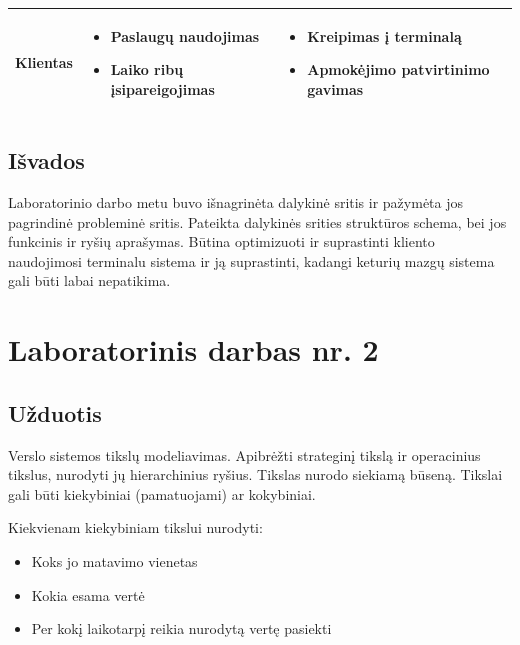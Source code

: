 \documentclass[10pt]{IEEEtran}
\begin{document}
\begin{table}[t]
\begin{tabular}{|c|p{5cm}|p{5cm}|}
                    Klientas &
                    \begin{itemize} 
                    \item Paslaugų naudojimas
                    \item Laiko ribų įsipareigojimas
                    \end{itemize}& 
                    \begin{itemize}
                    \item Kreipimas į terminalą
                    \item Apmokėjimo patvirtinimo gavimas
                    \end{itemize}\\ \hline
                \end{tabular}
            \end{table}

        \subsection{Išvados}

            Laboratorinio darbo metu buvo išnagrinėta dalykinė sritis ir pažymėta jos pagrindinė probleminė sritis. Pateikta dalykinės srities struktūros schema, bei jos funkcinis ir ryšių aprašymas. Būtina optimizuoti ir suprastinti kliento naudojimosi terminalu sistema ir ją suprastinti, kadangi keturių mazgų sistema gali būti labai nepatikima.

    \section{Laboratorinis darbas nr. 2}

        \subsection{Užduotis}

            Verslo sistemos tikslų modeliavimas. Apibrėžti strateginį tikslą ir operacinius tikslus, nurodyti jų hierarchinius ryšius. Tikslas nurodo siekiamą būseną. Tikslai gali būti kiekybiniai (pamatuojami) ar kokybiniai.

            Kiekvienam kiekybiniam tikslui nurodyti:

            \begin{itemize}
                \item Koks jo matavimo vienetas
                \item Kokia esama vertė
                \item Per kokį laikotarpį reikia nurodytą vertę pasiekti
            \end{itemize}    
\end{document}
